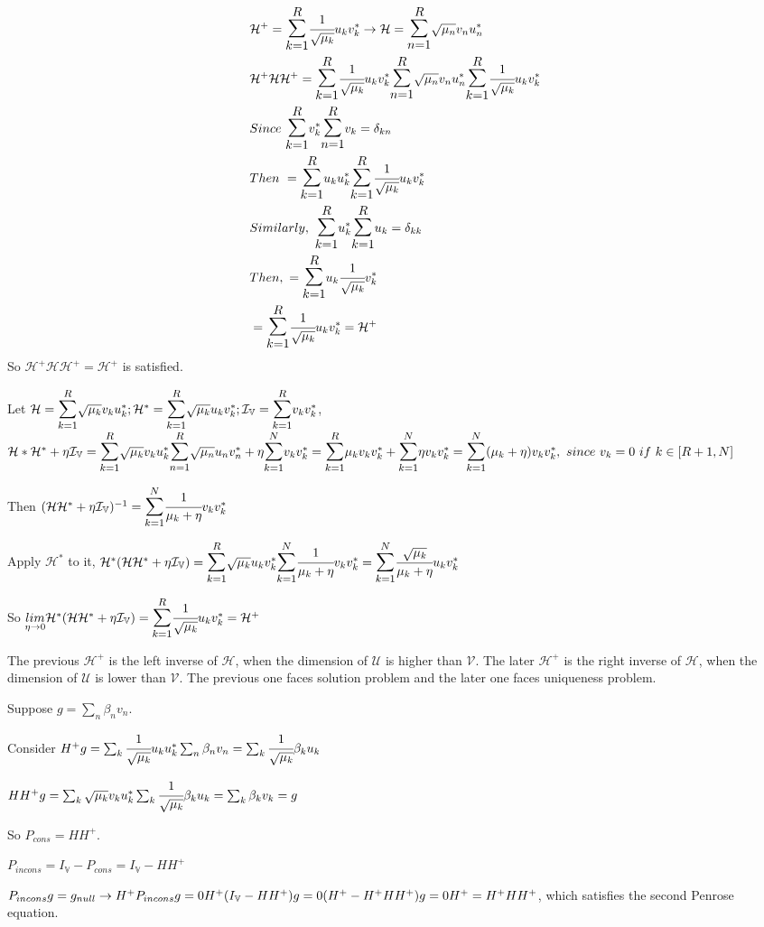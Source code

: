 \documentclass[11pt,a4paper]{article}
\newcommand{\svd}[1]{\bsum{#1=1}{R}\sqrt{\mu_{#1}}v_{#1}u_{#1}^*}
\newcommand{\isvd}[1]{\bsum{#1=1}{R}\cfrac{1}{\sqrt{\mu_{#1}}}u_{#1}v_{#1}^*}
\newcommand{\adsvd}[1]{\bsum{#1=1}{R}\sqrt{\mu_{#1}}u_{#1}v_{#1}^*}
\newcommand{\mh}{\mathcal{H}}
\newcommand{\mi}[1]{\mathcal{I}_{\mathbb{#1}}}
\begin{document}
\begin{align*}
&\mh^+=\isvd{k} \rightarrow \mh=\svd{n}\\
&\mh^+\mh\mh^+ =\isvd{k} \svd{n} \isvd{k}\\
&Since\ \bsum{k=1}{R}v_k^*\bsum{n=1}{R}v_k=\delta_{kn} \\
&Then\ =\bsum{k=1}{R}u_ku_k^* \isvd{k}\\
&Similarly,\ \bsum{k=1}{R}u_k^*\bsum{k=1}{R}u_k=\delta_{kk}\\
&Then,\ = \bsum{k=1}{R}u_k\cfrac{1}{\sqrt{\mu_k}}v_k^*\\
&=\isvd{k}=\mh^+
\end{align*}
So $\mh^+\mh\mh^+ = \mh^+$ is satisfied.

\newpage
{}
Let $\mh=\svd{k}; \mh^*=\adsvd{k}; \mi{V}=\bsum{k=1}{R}v_kv_k^*$, \\
$\mh*\mh^*+\eta\mi{V} =\svd{k}\adsvd{n}+\eta\bsum{k=1}{N}v_kv_k^*\\
=\bsum{k=1}{R}\mu_k v_k v_k^* +\bsum{k=1}{N}\eta v_k v_k^*\\
=\bsum{k=1}{N}(\mu_k+\eta)v_k v_k^*,\ since\ v_k=0\ if\ k\in[R+1,N]$

Then $(\mh\mh^*+\eta\mi{V})^{-1}=\bsum{k=1}{N}\cfrac{1}{\mu_k+\eta}v_kv_k^*$

Apply $\mh^*$ to it, $\mh^*(\mh\mh^*+\eta\mi{V})=\adsvd{k}\bsum{k=1}{N}\cfrac{1}{\mu_k+\eta}v_kv_k^*\\
=\bsum{k=1}{N}\cfrac{\sqrt{\mu_k}}{\mu_k+\eta}u_kv_k^*
$

So $\underset{\eta\rightarrow 0}{lim} \mh^*(\mh\mh^*+\eta\mi{V})=\isvd{k}=\mh^+$ 

The previous $\mh^+$ is the left inverse of $\mh$, when the dimension of $\mathcal{U}$ is higher than $\mathcal{V}$. The later $\mh^+$ is the right inverse of $\mh$, when the dimension of $\mathcal{U}$ is lower than $\mathcal{V}$. The previous one faces solution problem and the later one faces uniqueness problem. 

\newpage
{}
Suppose $g=\sum_n\beta_nv_n$.

Consider $H^+g=\sum_k\cfrac{1}{\sqrt{\mu_k}}u_ku_k^*\sum_n\beta_nv_n=\sum_k\cfrac{1}{\sqrt{\mu_k}}\beta_ku_k$ 

$HH^+g=\sum_k\sqrt{\mu_k}v_ku_k^*\sum_k\cfrac{1}{\sqrt{\mu_k}}\beta_ku_k=\sum_k\beta_kv_k=g$

So $P_{cons}=HH^+$. 

$P_{incons}=I_\mathbb{V}-P_{cons}=I_\mathbb{V}-HH^+$

$P_{incons}g=g_{null}\rightarrow H^+P_{incons}g=0\\
H^+(I_\mathbb{V}-HH^+)g=0\\
(H^+-H^+HH^+)g = 0\\
H^+ = H^+HH^+$,
which satisfies the second Penrose equation.
\end{document}
